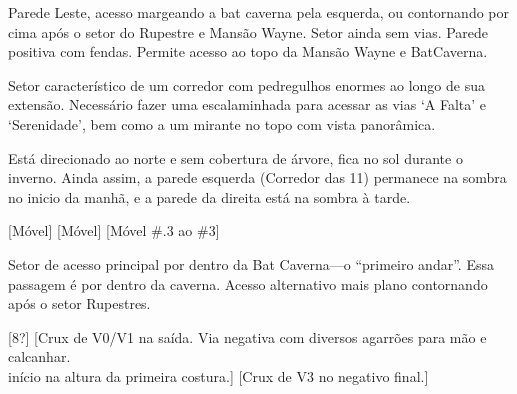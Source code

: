 \clearpage


Parede Leste, acesso margeando a bat caverna pela esquerda, ou contornando por cima após o setor do Rupestre e Mansão Wayne. Setor ainda sem vias. Parede positiva com fendas. Permite acesso ao topo da Mansão Wayne e BatCaverna.%

\clearpage


Setor característico de um corredor com pedregulhos enormes ao longo de sua extensão. Necessário fazer uma escalaminhada para acessar as vias `A Falta' e  `Serenidade', bem como a um mirante no topo com vista panorâmica.

Está direcionado ao norte e sem cobertura de árvore, fica no sol durante o inverno. Ainda assim, a parede esquerda (Corredor das 11) permanece na sombra no inicio da manhã, e a parede da direita está na sombra à tarde.

\begin{CGSectorRoutes}%
    [Móvel]
    [Móvel]
    [Móvel \#.3 ao \#3]
\end{CGSectorRoutes}


Setor de acesso principal por dentro da Bat Caverna---o ``primeiro andar''. Essa passagem é por dentro da caverna. Acesso alternativo mais plano contornando após o setor Rupestres.

\begin{CGSectorRoutes}
    [8?]
    [Crux de V0/V1 na saída. Via negativa com diversos agarrões para mão e calcanhar. \\ \CGObs início na altura da primeira costura.]
    [Crux de V3 no negativo final.]
\end{CGSectorRoutes}



